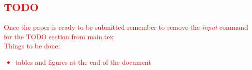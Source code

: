 \textcolor{red}{
\section{TODO}
Once the paper is ready to be submitted remember to remove the \emph{input} command for the TODO section from main.tex\\
Things to be done:
\begin{itemize}
  \item tables and figures at the end of the document
\end{itemize}
}
